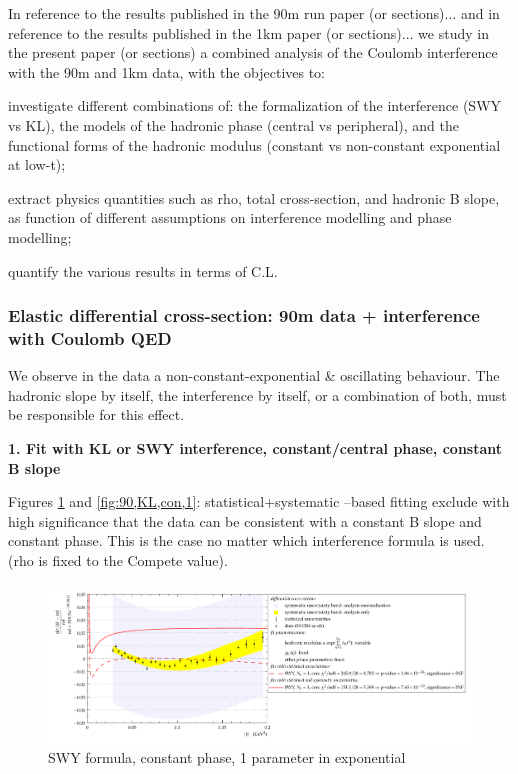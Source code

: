 In reference to the results published in the 90m run paper (or sections)... and in reference to the results published in the 1km paper (or sections)... we study in the present paper (or sections) a combined analysis of the Coulomb interference with the 90m and 1km data, with the objectives to:

\> investigate different combinations of: the formalization of the interference (SWY vs
KL), the models of the hadronic phase (central vs peripheral), and the functional
forms of the hadronic modulus (constant vs non-constant exponential at low-t);

\> extract physics quantities such as rho, total cross-section, and hadronic B slope, as
function of different assumptions on interference modelling and phase modelling;

\> quantify the various results in terms of C.L.


\subsubsection{Elastic differential cross-section: 90m data + interference with Coulomb QED}


We observe in the data a non-constant-exponential \& oscillating behaviour.
The hadronic slope by itself, the interference by itself, or a combination of both, must be
responsible for this effect.

\iffalse
{\bf 1. Fit with KL or SWY interference, constant/central phase, constant B slope}

Figures \ref{fig:90,SWY,con,1} and \ref{fig:90,KL,con,1}: statistical+systematic –based fitting exclude with high significance that the data can be
consistent with a constant B slope and constant phase. This is the case no matter which
interference formula is used. (rho is fixed to the Compete value).

\begin{figure}
\begin{center}
\includegraphics[width=18cm]{simone/90/SWY,con,1,stat-stat+syst.pdf}
\vskip-3mm
\caption{SWY formula, constant phase, 1 parameter in exponential}
\label{fig:90,SWY,con,1}
\end{center}
\end{figure}

